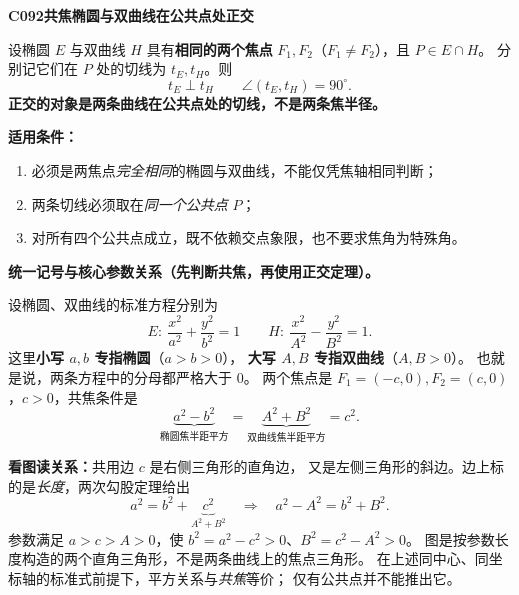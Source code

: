 \begin{statementbox}
\textbf{C092\quad 共焦椭圆与双曲线在公共点处正交}

设椭圆 $E$ 与双曲线 $H$ 具有\textbf{相同的两个焦点}
$F_1,F_2$（$F_1\ne F_2$），且 $P\in E\cap H$。
分别记它们在 $P$ 处的切线为 $t_E,t_H$。则
\[
\boxed{t_E\perp t_H}\qquad
\boxed{\angle(t_E,t_H)=90^\circ}.
\]
\textbf{正交的对象是两条曲线在公共点处的切线，不是两条焦半径。}

\begin{center}

\end{center}

\textbf{适用条件：}
\begin{enumerate}
\item 必须是两焦点\emph{完全相同}的椭圆与双曲线，不能仅凭焦轴相同判断；
\item 两条切线必须取在\emph{同一个公共点} $P$；
\item 对所有四个公共点成立，既不依赖交点象限，也不要求焦角为特殊角。
\end{enumerate}
\end{statementbox}

\clearpage
\begin{statementbox}
\textbf{统一记号与核心参数关系（先判断共焦，再使用正交定理）。}

设椭圆、双曲线的标准方程分别为
\[
\boxed{E:\ \frac{x^2}{a^2}+\frac{y^2}{b^2}=1}\qquad
\boxed{H:\ \frac{x^2}{A^2}-\frac{y^2}{B^2}=1}.
\]
这里\textbf{小写 $a,b$ 专指椭圆}（$a>b>0$），
\textbf{大写 $A,B$ 专指双曲线}（$A,B>0$）。
也就是说，两条方程中的分母都严格大于 $0$。
两个焦点是 $F_1=(-c,0),F_2=(c,0)$，$c>0$，共焦条件是
\[
\underbrace{a^2-b^2}_{\text{椭圆焦半距平方}}
=\underbrace{A^2+B^2}_{\text{双曲线焦半距平方}}
=c^2.
\]
\begin{center}

\end{center}
\textbf{看图读关系：}共用边 $c$ 是右侧三角形的直角边，
又是左侧三角形的斜边。边上标的是\emph{长度}，两次勾股定理给出
\[
a^2=b^2+\underbrace{c^2}_{A^2+B^2}
\quad\Longrightarrow\quad\boxed{a^2-A^2=b^2+B^2}.
\]
参数满足 $\boxed{a>c>A>0}$，使 $b^2=a^2-c^2>0$、$B^2=c^2-A^2>0$。
图是按参数长度构造的两个直角三角形，不是两条曲线上的焦点三角形。
在上述同中心、同坐标轴的标准式前提下，平方关系与\emph{共焦}等价；
仅有公共点并不能推出它。
\end{statementbox}
